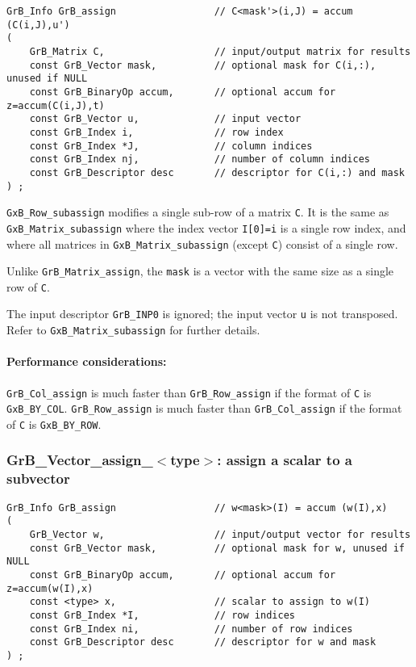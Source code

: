 \documentclass[12pt]{article}
\begin{document}
\begin{mdframed}[userdefinedwidth=6in]
{\footnotesize
\begin{verbatim}
GrB_Info GrB_assign                 // C<mask'>(i,J) = accum (C(i,J),u')
(
    GrB_Matrix C,                   // input/output matrix for results
    const GrB_Vector mask,          // optional mask for C(i,:), unused if NULL
    const GrB_BinaryOp accum,       // optional accum for z=accum(C(i,J),t)
    const GrB_Vector u,             // input vector
    const GrB_Index i,              // row index
    const GrB_Index *J,             // column indices
    const GrB_Index nj,             // number of column indices
    const GrB_Descriptor desc       // descriptor for C(i,:) and mask
) ;
\end{verbatim} } \end{mdframed}

\verb'GxB_Row_subassign' modifies a single sub-row of a matrix \verb'C'.  It is
the same as \verb'GxB_Matrix_subassign' where the index vector \verb'I[0]=i' is
a single row index, and where all matrices in \verb'GxB_Matrix_subassign'
(except \verb'C') consist of a single row.

Unlike \verb'GrB_Matrix_assign', the \verb'mask' is a vector with the same size
as a single row of \verb'C'.

The input descriptor \verb'GrB_INP0' is ignored; the input vector \verb'u' is
not transposed.  Refer to \verb'GxB_Matrix_subassign' for further details.

\paragraph{\bf Performance considerations:} %
\verb'GrB_Col_assign' is much faster than \verb'GrB_Row_assign' if the format
of \verb'C' is \verb'GxB_BY_COL'.  \verb'GrB_Row_assign' is much faster than
\verb'GrB_Col_assign' if the format of \verb'C' is \verb'GxB_BY_ROW'.

\newpage
\subsubsection{{\sf GrB\_Vector\_assign\_$<$type$>$:} assign a scalar to a subvector}
\label{assign_vector_scalar}

\begin{mdframed}[userdefinedwidth=6in]
{\footnotesize
\begin{verbatim}
GrB_Info GrB_assign                 // w<mask>(I) = accum (w(I),x)
(
    GrB_Vector w,                   // input/output vector for results
    const GrB_Vector mask,          // optional mask for w, unused if NULL
    const GrB_BinaryOp accum,       // optional accum for z=accum(w(I),x)
    const <type> x,                 // scalar to assign to w(I)
    const GrB_Index *I,             // row indices
    const GrB_Index ni,             // number of row indices
    const GrB_Descriptor desc       // descriptor for w and mask
) ;
\end{verbatim} } \end{mdframed}
\end{document}
